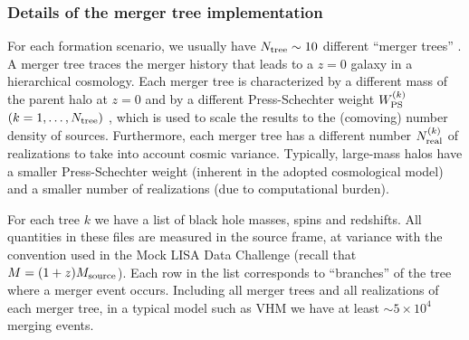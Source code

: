 \documentclass{iopart}
\begin{document}
\subsubsection{Details of the merger tree implementation}

For each formation scenario, we usually have $N_{\rm tree}\sim 10$ different
``merger trees'' \cite{Lacey:1993iv}. A merger tree traces the merger history
that leads to a $z=0$ galaxy in a hierarchical cosmology. Each merger tree is
characterized by a different mass of the parent halo at $z=0$ and by a
different Press-Schechter weight $W_{\rm PS}^{(k)}$ $(k=1,\dots,N_{\rm tree})$
\cite{Press:1973iz,Sheth:2001dp}, which is used to scale the results to the
(comoving) number density of sources. Furthermore, each merger tree has a
different number $N_{\rm real}^{(k)}$ of realizations to take into account
cosmic variance.  Typically, large-mass halos have a smaller Press-Schechter
weight (inherent in the adopted cosmological model) and a smaller number of
realizations (due to computational burden).

For each tree $k$ we have a list of black hole masses, spins and
redshifts. All quantities in these files are measured in the source frame, at
variance with the convention used in the Mock LISA Data Challenge (recall that
$M=(1+z)M_{\rm source}$). Each row in the list corresponds to ``branches'' of
the tree where a merger event occurs. Including all merger trees and all
realizations of each merger tree, in a typical model such as VHM we have at
least $\sim 5\times 10^4$ merging events. 
\end{document}
